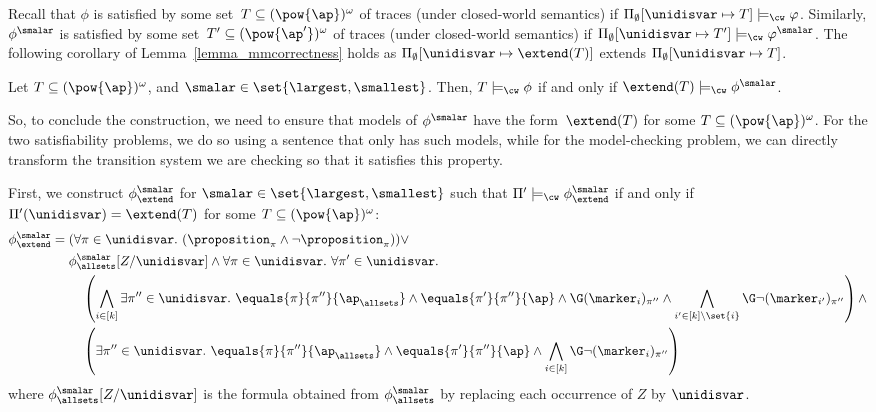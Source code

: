Recall that $\phi$ is satisfied by some set~$T \subseteq (\pow{\ap})^\omega$ of traces (under closed-world semantics) if $\Pi_\emptyset[\unidisvar\mapsto T] \models_\cw \varphi$.
Similarly, $\phi^\smalar$ is satisfied by some set~$T' \subseteq (\pow{\ap'})^\omega$ of traces (under closed-world semantics) if $\Pi_\emptyset[\unidisvar\mapsto T'] \models_\cw \varphi^\smalar$.
The following corollary of Lemma~\ref{lemma_mmcorrectness} holds as $\Pi_\emptyset[\unidisvar\mapsto \extend(T)]$ extends $\Pi_\emptyset[\unidisvar\mapsto T]$.

\begin{cor}
\label{coro_mmcorrectness}
Let $T\subseteq (\pow{\ap})^\omega$, and $\smalar \in \set{\largest,\smallest}$. Then, $T \models_\cw \phi$ if and only if $\extend(T) \models_\cw \phi^\smalar$.
\end{cor}

So, to conclude the construction, we need to ensure that models of $\phi^\smalar$ have the form~$\extend(T)$ for some $T \subseteq (\pow{\ap})^\omega$.
For the two satisfiability problems, we do so using a sentence that only has such models, while for the model-checking problem, we can directly transform the transition system we are checking so that it satisfies this property.

First, we construct $\phi_\extend^{\smalar}$ for $\smalar \in \set{\largest,\smallest}$ such that $\Pi'\models_\cw \phi_\extend^{\smalar}$ if and only if $\Pi'(\unidisvar) = \extend(T)$ for some $T \subseteq (\pow{\ap})^\omega$:
\begin{align*}
\phi_\extend^{\smalar} ={}&{} (\forall \pi \in \unidisvar.\ (\proposition_\pi \wedge \neg \proposition_\pi)) \vee \\
{}&{}\phi_\allsets^{\smalar}[Z/\unidisvar] \wedge \forall \pi \in \unidisvar.\ \forall \pi' \in \unidisvar.\ \\
{}&{}\quad
\left(
\bigwedge_{i \in [k]} \exists \pi'' \in \unidisvar.\ 
\equals{\pi}{\pi''}{\ap_\allsets} \wedge 
\equals{\pi'}{\pi''}{\ap} \wedge 
\G (\marker_i)_{\pi''} \wedge \bigwedge_{i' \in [k]\setminus\set{i}} \G\neg(\marker_{i'})_{\pi''}
\right) \wedge\\
{}&{}\quad
\left( 
 \exists \pi'' \in \unidisvar.\ 
\equals{\pi}{\pi''}{\ap_\allsets} \wedge 
\equals{\pi'}{\pi''}{\ap} \wedge 
\bigwedge_{i \in [k]} \G\neg(\marker_{i})_{\pi''}
\right)
\end{align*}
where $\phi_\allsets^{\smalar}[Z/\unidisvar]$ is the formula obtained from $\phi_\allsets^{\smalar}$ by replacing each occurrence of $Z$ by $\unidisvar$.

